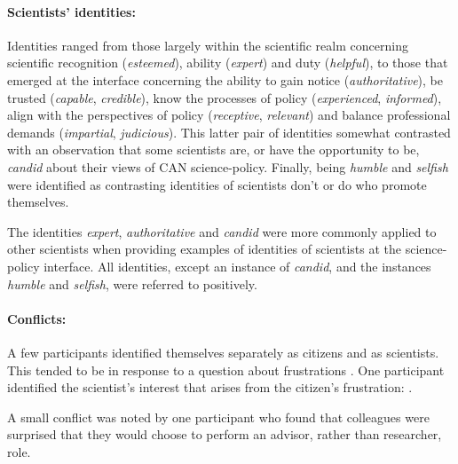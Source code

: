 \paragraph{Scientists' identities:}
Identities ranged from those largely within the scientific realm concerning scientific recognition (\emph{esteemed}), ability (\emph{expert}) and duty (\emph{helpful}), to those that emerged at the interface concerning the ability to gain notice (\emph{authoritative}), be trusted (\emph{capable}, \emph{credible}), know the processes of policy (\emph{experienced}, \emph{informed}), align with the perspectives of policy (\emph{receptive}, \emph{relevant}) and balance professional demands (\emph{impartial}, \emph{judicious}). This latter pair of identities somewhat contrasted with an observation that some scientists are, or have the opportunity to be, \emph{candid} about their views of CAN science-policy. Finally, being \emph{humble} and \emph{selfish} were identified as contrasting identities of scientists don't or do who promote themselves.

The identities \emph{expert}, \emph{authoritative} and \emph{candid} were more commonly applied to other scientists when providing examples of identities of scientists at the science-policy interface. All identities, except an instance of \emph{candid}, and the instances \emph{humble} and \emph{selfish}, were referred to positively.

\paragraph{Conflicts:}
A few participants identified themselves separately as citizens and as scientists. This tended to be in response to a question about frustrations . One participant identified the scientist's interest that arises from the citizen's frustration: .

A small conflict was noted by one participant who found that colleagues were surprised that they would choose to perform an advisor, rather than researcher, role.

